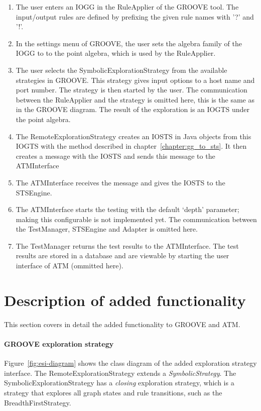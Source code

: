 \begin{enumerate}
\item The user enters an IOGG in the RuleApplier of the GROOVE tool. The input/output rules are defined by prefixing the given rule names with '?' and '!'. 
\item In the settings menu of GROOVE, the user sets the algebra family of the IOGG to to the point algebra, which is used by the RuleApplier.
\item The user selects the SymbolicExplorationStrategy from the available strategies in GROOVE. This strategy gives input options to a host name and port number. The strategy is then started by the user. The communication between the RuleApplier and the strategy is omitted here, this is the same as in the GROOVE diagram. The result of the exploration is an IOGTS under the point algebra.
\item The RemoteExplorationStrategy creates an IOSTS in Java objects from this IOGTS with the method described in chapter~\ref{chapter:gg_to_sts}. It then creates a message with the IOSTS and sends this message to the ATMInterface
\item The ATMInterface receives the message and gives the IOSTS to the STSEngine.
\item The ATMInterface starts the testing with the default `depth' parameter; making this configurable is not implemented yet. The communication between the TestManager, STSEngine and Adapter is omitted here.
\item The TestManager returns the test results to the ATMInterface. The test results are stored in a database and are viewable by starting the user interface of ATM (ommitted here).
\end{enumerate}

\section{Description of added functionality}\label{sec:added_func}
This section covers in detail the added functionality to GROOVE and ATM. 

\paragraph*{GROOVE exploration strategy}
Figure~\ref{fig:esi-diagram} shows the class diagram of the added exploration strategy interface. The RemoteExplorationStrategy extends a \textit{SymbolicStrategy}. The SymbolicExplorationStrategy has a \textit{closing} exploration strategy, which is a strategy that explores all graph states and rule transitions, such as the BreadthFirstStrategy.

